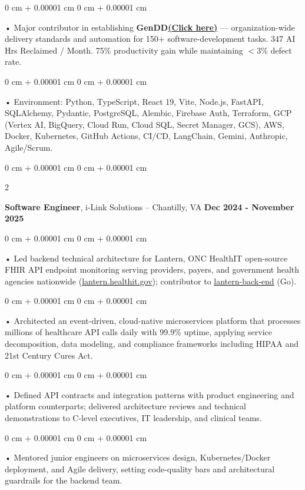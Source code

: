 \documentclass[10pt, letterpaper]{article}
\newenvironment{onecolentry}{
    \begin{adjustwidth}{
        0 cm + 0.00001 cm
    }{
        0 cm + 0.00001 cm
    }
}{
    \end{adjustwidth}
} %
\newenvironment{twocolentry}[2][]{
    \onecolentry
    \def\secondColumn{#2}
    \setcolumnwidth{\fill, 4.5 cm}
    \begin{paracol}{2}
}{
    \switchcolumn \raggedleft \secondColumn
    \end{paracol}
    \endonecolentry
} %
\begin{document}
        \begin{onecolentry}
             • Major contributor in establishing \textbf{GenDD}\href{https://hatchworks.com/generative-driven-development/}{\textbf{(Click here)}} --- organization-wide delivery standards and automation for 150+ software-development tasks. 347 AI Hrs Reclaimed / Month. 75\% productivity gain while maintaining $<$3\% defect rate.
        \end{onecolentry}
        \begin{onecolentry}
             • Environment: Python, TypeScript, React 19, Vite, Node.js, FastAPI, SQLAlchemy, Pydantic, PostgreSQL, Alembic, Firebase Auth, Terraform, GCP (Vertex AI, BigQuery, Cloud Run, Cloud SQL, Secret Manager, GCS), AWS, Docker, Kubernetes, GitHub Actions, CI/CD, LangChain, Gemini, Anthropic, Agile/Scrum.
        \end{onecolentry}

        \vspace{0.1cm}

        \begin{twocolentry}{
            \textbf{Dec 2024 - November 2025}
        }
            \textbf{Software Engineer}, i-Link Solutions -- Chantilly, VA\end{twocolentry}


        \begin{onecolentry}
             • Led backend technical architecture for Lantern, ONC HealthIT open-source FHIR API endpoint monitoring serving providers, payers, and government health agencies nationwide (\href{https://lantern.healthit.gov/?tab=dashboard_tab}{lantern.healthit.gov}); contributor to \href{https://github.com/onc-healthit/lantern-back-end}{lantern-back-end} (Go).
        \end{onecolentry}
        \begin{onecolentry}
             • Architected an event-driven, cloud-native microservices platform that processes millions of healthcare API calls daily with 99.9\% uptime, applying service decomposition, data modeling, and compliance frameworks including HIPAA and 21st Century Cures Act.
        \end{onecolentry}
        \begin{onecolentry}
             • Defined API contracts and integration patterns with product engineering and platform counterparts; delivered architecture reviews and technical demonstrations to C-level executives, IT leadership, and clinical teams.
        \end{onecolentry}
        \begin{onecolentry}
             • Mentored junior engineers on microservices design, Kubernetes/Docker deployment, and Agile delivery, setting code-quality bars and architectural guardrails for the backend team.
        \end{onecolentry}
\end{document}
